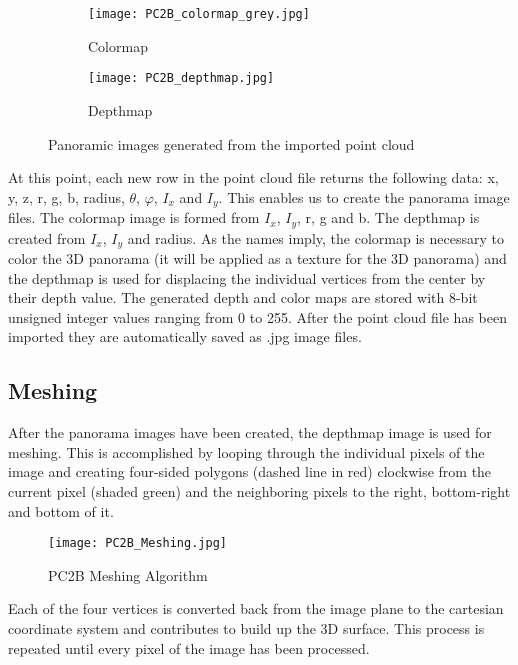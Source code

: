 \begin{figure}[h]
	\centering
	\begin{subfigure}[b]{0.45\textwidth}
		\centering
		\texttt{[image: PC2B\_colormap\_grey.jpg]}
		\caption{Colormap}
		\label{fig:PC2B_colormap_grey}
	\end{subfigure}
	\hfill
	\begin{subfigure}[b]{0.45\textwidth}
		\centering
		\texttt{[image: PC2B\_depthmap.jpg]}
		\caption{Depthmap}
		\label{fig:PC2B_depthmap}
	\end{subfigure}
	\caption{Panoramic images generated from the imported point cloud}
	\label{fig:PC2B_Panorama_images}
\end{figure}

At this point, each new row in the point cloud file returns the following data: x, y, z, r, g, b, radius, $\theta$, $\varphi$,  $I_x$ and  $I_y$. This enables us to create the panorama image files. The colormap image is formed from $I_x$, $I_y$, r, g and b. The depthmap is created from $I_x$, $I_y$ and radius. As the names imply, the colormap is necessary to color the 3D panorama (it will be applied as a texture for the 3D panorama) and the depthmap is used for displacing the individual vertices from the center by their depth value. The generated depth and color maps are stored with 8-bit unsigned integer values ranging from 0 to 255. After the point cloud file has been imported they are automatically saved as .jpg image files.

\subsection{Meshing}

After the panorama images have been created, the depthmap image is used for meshing. This is accomplished by looping through the individual pixels of the image and creating four-sided polygons (dashed line in red) clockwise from the current pixel (shaded green) and the neighboring pixels to the right, bottom-right and bottom of it.

\begin{figure}[h]
	\centering
	\texttt{[image: PC2B\_Meshing.jpg]}
	\caption{PC2B Meshing Algorithm}
	\label{fig:pc2b_meshing}
\end{figure}

Each of the four vertices is converted back from the image plane to the cartesian coordinate system and contributes to build up the 3D surface. This process is repeated until every pixel of the image has been processed.

